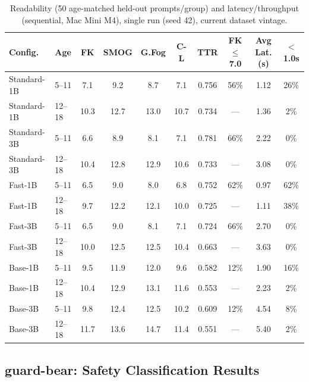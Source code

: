 \documentclass[pdflatex,sn-mathphys-num]{sn-jnl}%
\begin{document}
\begin{table}[!h]
  \caption{Readability (50 age-matched held-out prompts/group) and latency/throughput (sequential, Mac Mini M4), single run (seed 42), current dataset vintage.}
  \label{tab:res2}
  \scriptsize
  \setlength{\tabcolsep}{3pt}
  \begin{tabular}{@{}llcccccccc@{}}
    \toprule
    Config. & Age & FK & SMOG & G.Fog & C-L & TTR & FK$\leq$7.0 & Avg Lat.(s) & $<$1.0s \\
    \midrule
    Standard-1B & 5--11  & 7.1  & 9.2  & 8.7  & 7.1  & 0.756 & 56\% & 1.12 & 26\% \\
    Standard-1B & 12--18 & 10.3 & 12.7 & 13.0 & 10.7 & 0.734 & ---  & 1.36 & 2\%  \\
    Standard-3B & 5--11  & 6.6  & 8.9  & 8.1  & 7.1  & 0.781 & 66\% & 2.22 & 0\%  \\
    Standard-3B & 12--18 & 10.4 & 12.8 & 12.9 & 10.6 & 0.733 & ---  & 3.08 & 0\%  \\
    Fast-1B     & 5--11  & 6.5  & 9.0  & 8.0  & 6.8  & 0.752 & 62\% & 0.97 & 62\% \\
    Fast-1B     & 12--18 & 9.7  & 12.2 & 12.1 & 10.0 & 0.725 & ---  & 1.11 & 38\% \\
    Fast-3B     & 5--11  & 6.5  & 9.0  & 8.1  & 7.1  & 0.724 & 66\% & 2.70 & 0\%  \\
    Fast-3B     & 12--18 & 10.0 & 12.5 & 12.5 & 10.4 & 0.663 & ---  & 3.63 & 0\%  \\
    Base-1B     & 5--11  & 9.5  & 11.9 & 12.0 & 9.6  & 0.582 & 12\% & 1.90 & 16\% \\
    Base-1B     & 12--18 & 10.4 & 12.9 & 13.1 & 11.6 & 0.553 & ---  & 2.23 & 2\%  \\
    Base-3B     & 5--11  & 9.8  & 12.4 & 12.5 & 10.2 & 0.609 & 12\% & 4.54 & 8\%  \\
    Base-3B     & 12--18 & 11.7 & 13.6 & 14.7 & 11.4 & 0.551 & ---  & 5.40 & 2\%  \\
    \bottomrule
  \end{tabular}
\end{table}

\subsection{guard-bear: Safety Classification Results}\label{sec:guardresults}
\end{document}
